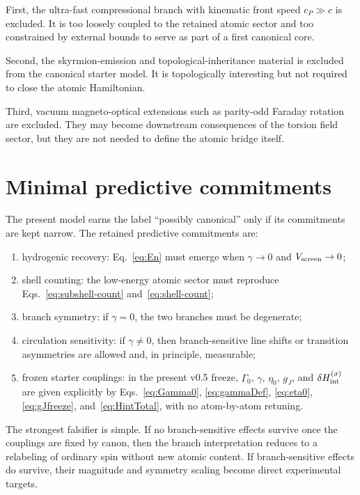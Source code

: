 \documentclass[11pt,a4paper]{article}
\begin{document}
First, the ultra-fast compressional branch with kinematic front speed $c_P\gg c$ is excluded. It is too loosely coupled to the retained atomic sector and too constrained by external bounds to serve as part of a first canonical core.

Second, the skyrmion-emission and topological-inheritance material is excluded from the canonical starter model. It is topologically interesting but not required to close the atomic Hamiltonian.

Third, vacuum magneto-optical extensions such as parity-odd Faraday rotation are excluded. They may become downstream consequences of the torsion field sector, but they are not needed to define the atomic bridge itself.

\section{Minimal predictive commitments}
The present model earns the label ``possibly canonical'' only if its commitments are kept narrow. The retained predictive commitments are:
\begin{enumerate}[label=(P\arabic*)]
    \item hydrogenic recovery: Eq.~\eqref{eq:En} must emerge when $\gamma\to 0$ and $V_{\rm screen}\to 0$;
    \item shell counting: the low-energy atomic sector must reproduce Eqs.~\eqref{eq:subshell-count} and~\eqref{eq:shell-count};
    \item branch symmetry: if $\gamma=0$, the two branches must be degenerate;
    \item circulation sensitivity: if $\gamma\neq 0$, then branch-sensitive line shifts or transition asymmetries are allowed and, in principle, measurable;
    \item frozen starter couplings: in the present v0.5 freeze, $\Gamma_0$, $\gamma$, $\eta_0$, $g_J$, and $\delta H_{\rm int}^{(\sigma)}$ are given explicitly by Eqs.~\eqref{eq:Gamma0}, \eqref{eq:gammaDef}, \eqref{eq:eta0}, \eqref{eq:gJfreeze}, and~\eqref{eq:HintTotal}, with no atom-by-atom retuning.
\end{enumerate}

The strongest falsifier is simple. If no branch-sensitive effects survive once the couplings are fixed by canon, then the branch interpretation reduces to a relabeling of ordinary spin without new atomic content. If branch-sensitive effects do survive, their magnitude and symmetry scaling become direct experimental targets.
\end{document}

